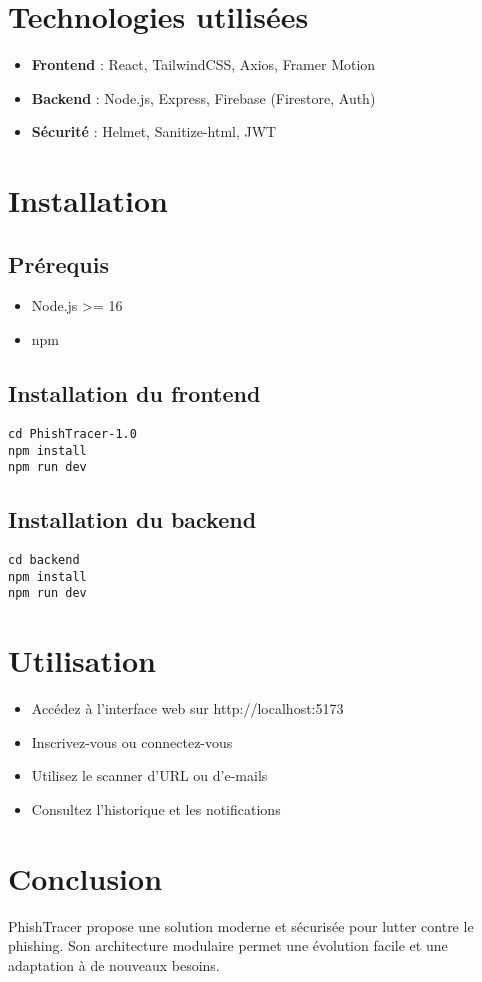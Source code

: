 \documentclass[12pt,a4paper]{report}
\begin{document}
\chapter{Technologies utilisées}
\begin{itemize}
  \item \textbf{Frontend} : React, TailwindCSS, Axios, Framer Motion
  \item \textbf{Backend} : Node.js, Express, Firebase (Firestore, Auth)
  \item \textbf{Sécurité} : Helmet, Sanitize-html, JWT
\end{itemize}

\chapter{Installation}
\section{Prérequis}
\begin{itemize}
  \item Node.js >= 16
  \item npm
\end{itemize}

\section{Installation du frontend}
\begin{verbatim}
cd PhishTracer-1.0
npm install
npm run dev
\end{verbatim}

\section{Installation du backend}
\begin{verbatim}
cd backend
npm install
npm run dev
\end{verbatim}

\chapter{Utilisation}
\begin{itemize}
  \item Accédez à l'interface web sur http://localhost:5173
  \item Inscrivez-vous ou connectez-vous
  \item Utilisez le scanner d'URL ou d'e-mails
  \item Consultez l'historique et les notifications
\end{itemize}

\chapter{Conclusion}
PhishTracer propose une solution moderne et sécurisée pour lutter contre le phishing. Son architecture modulaire permet une évolution facile et une adaptation à de nouveaux besoins.
\end{document}
